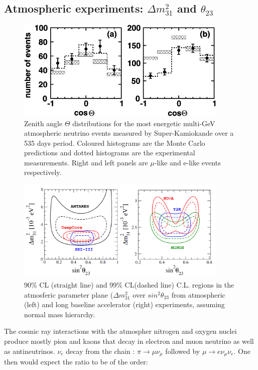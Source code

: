 \documentclass[12pt,a4paper,openright,twoside]{report}
\begin{document}
\subsection{Atmospheric experiments: $\Delta m_{31}^2 $ and $ \theta_{23}$}
\begin{figure}
	\centering
	\includegraphics[width=0.9\textwidth]{superk.png}
	\caption{\label{superk:fig} Zenith angle $\Theta $ distributions for the most energetic multi-GeV atmospheric neutrino events measured by Super-Kamiokande over a 535 days period. Coloured histograms are the Monte Carlo predictions and dotted histograms are the experimental measurements. Right and left panels are $\mu$-like and e-like events respectively. }
\end{figure}
\begin{figure}
	\centering
	\includegraphics[width=0.9\textwidth]{atmnu.png}
	\caption{\label{atmnu:fig}90\% CL (straight line) and 99\% CL(dashed line) C.L. regions in the atmosferic parameter plane ($\Delta m_{31}^2$ over $sin^2 \theta_{23}$ from atmospheric (left) and long baseline accelerator (right) experiments, assuming normal mass hierarchy. }
\end{figure}
The cosmic ray interactions with the atmospher nitrogen and oxygen nuclei produce mostly pion and kaons that decay in electron and muon neutrino as well as antineutrinos. $\nu_e$ decay from the chain : $\pi \rightarrow \mu \nu_\mu$ followed by $\mu \rightarrow e \nu_\mu \nu_e $. One then would expect the ratio to be of the order:
\end{document}
